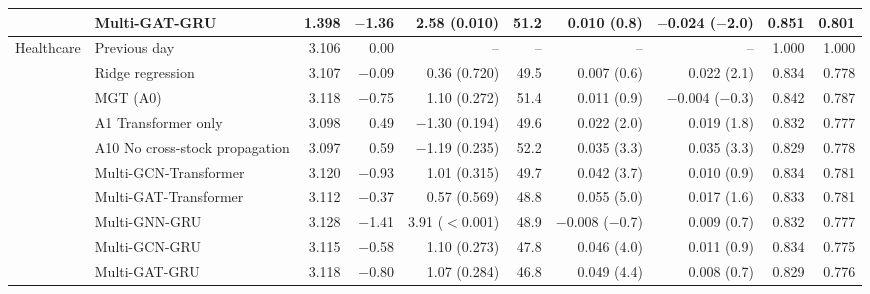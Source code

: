 \begin{table}[!t]
{\begin{tabular}{llrrrrrrrr}
 & Multi-GAT-GRU & 1.398 & $-$1.36 & 2.58 (0.010) & 51.2 & 0.010 (0.8) & $-$0.024 ($-$2.0) & 0.851 & 0.801 \\
\midrule
Healthcare & Previous day & 3.106 & 0.00 & -- & -- & -- & -- & 1.000 & 1.000 \\
 & Ridge regression & 3.107 & $-$0.09 & 0.36 (0.720) & 49.5 & 0.007 (0.6) & 0.022 (2.1) & 0.834 & 0.778 \\
 & MGT (A0) & 3.118 & $-$0.75 & 1.10 (0.272) & 51.4 & 0.011 (0.9) & $-$0.004 ($-$0.3) & 0.842 & 0.787 \\
 & A1 Transformer only & 3.098 & 0.49 & $-$1.30 (0.194) & 49.6 & 0.022 (2.0) & 0.019 (1.8) & 0.832 & 0.777 \\
 & A10 No cross-stock propagation & 3.097 & 0.59 & $-$1.19 (0.235) & 52.2 & 0.035 (3.3) & 0.035 (3.3) & 0.829 & 0.778 \\
 & Multi-GCN-Transformer & 3.120 & $-$0.93 & 1.01 (0.315) & 49.7 & 0.042 (3.7) & 0.010 (0.9) & 0.834 & 0.781 \\
 & Multi-GAT-Transformer & 3.112 & $-$0.37 & 0.57 (0.569) & 48.8 & 0.055 (5.0) & 0.017 (1.6) & 0.833 & 0.781 \\
 & Multi-GNN-GRU & 3.128 & $-$1.41 & 3.91 ($<$0.001) & 48.9 & $-$0.008 ($-$0.7) & 0.009 (0.7) & 0.832 & 0.777 \\
 & Multi-GCN-GRU & 3.115 & $-$0.58 & 1.10 (0.273) & 47.8 & 0.046 (4.0) & 0.011 (0.9) & 0.834 & 0.775 \\
 & Multi-GAT-GRU & 3.118 & $-$0.80 & 1.07 (0.284) & 46.8 & 0.049 (4.4) & 0.008 (0.7) & 0.829 & 0.776 \\
\bottomrule
\end{tabular}}
\end{table}